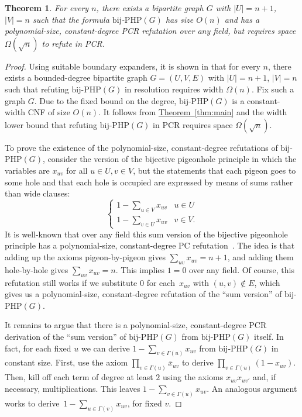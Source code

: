 \documentclass[11pt]{article}
\numberwithin{equation}{section}
\newtheorem{theorem}{Theorem}[section]
\theoremstyle{definition}
\theoremstyle{plain}
\newcommand{\expref}[2]{\hyperref[#2]{#1~\ref{#2}}}
\begin{document}
\begin{theorem}
For every $n$, there exists a bipartite graph $G$ with $|U| = n+1$, 
$|V| =n$ such that the formula $\mathrm{bij}$-$\mathrm{PHP}(G)$ has size $O(n)$
and has a polynomial-size, constant-degree PCR refutation over any field, but requires space $\Omega(\sqrt n)$ to refute in PCR.
\end{theorem}

\begin{proof}
Using suitable boundary expanders, it is shown in \cite[Section 4]{DBLP:journals/fuin/ItsyksonOSS16} that for every $n$, 
there exists a bounded-degree bipartite graph $G=(U,V,E)$ with $|U| = n+1$, $|V| =n$ such that
refuting $\mathrm{bij}$-$\mathrm{PHP}(G)$ in resolution requires width $\Omega(n)$. Fix such a graph $G$.
Due to the fixed bound on the degree, $\mathrm{bij}$-$\mathrm{PHP}(G)$ is a constant-width CNF
of size $O(n)$. It follows from \expref{Theorem}{thm:main} and the width lower bound
that refuting $\mathrm{bij}$-$\mathrm{PHP}(G)$ in PCR requires space $\Omega(\sqrt n)$.

To prove the existence of the polynomial-size, constant-degree refutations of 
$\mathrm{bij}$-$\mathrm{PHP}(G)$, consider the version of the bijective pigeonhole principle 
in which the variables are $x_{uv}$ for all $u \in U, v \in V$,  
but the statements that each pigeon goes to some hole and that each hole 
is occupied are expressed by means of sums rather than wide clauses:
\[
\left \{
\begin{array}{ll}
1 - \sum_{u \in V} x_{uv}   & u \in U \\
1 - \sum_{v \in U} x_{uv} & v \in V. 
\end{array}
\right.
\]
It is well-known that over any field this sum version of the bijective pigeonhole principle %
has a polynomial-size, constant-degree PC refutation~\cite{riis}. The idea is that adding up the axioms
pigeon-by-pigeon gives $\sum_{uv} x_{uv} = n+1$, and adding them hole-by-hole 
gives $\sum_{uv} x_{uv} = n$. This implies $1 = 0$ over any field. Of course,
this refutation still works if we substitute $0$ for each~$x_{uv}$ with $(u,v) \notin E$,
which gives us a polynomial-size, constant-degree refutation of the ``sum version''
of $\mathrm{bij}$-$\mathrm{PHP}(G)$.

It remains to argue that there is a polynomial-size, constant-degree PCR derivation 
of the ``sum version'' of $\mathrm{bij}$-$\mathrm{PHP}(G)$ from
$\mathrm{bij}$-$\mathrm{PHP}(G)$ itself. 
In fact, for each fixed $u$ we can derive $1 - \sum_{v \in \Gamma(u)} x_{uv}$  
 from $\mathrm{bij}$-$\mathrm{PHP}(G)$
in 
constant size. 
First, use the axiom $\prod_{v \in \Gamma(u)}\bar x_{uv}$ 
to derive $\prod_{v \in \Gamma(u)}(1-x_{uv})$. 
Then, kill off each term of degree at least $2$ using the axioms $x_{uv}x_{uv'}$ and, if necessary, multiplications.
This leaves $1 - \sum_{v \in \Gamma(u)} x_{uv}$.
An analogous argument works to derive~$1 - \sum_{u \in \Gamma(v)} x_{uv}$, for fixed $v$.
\end{proof}
\end{document}

